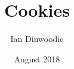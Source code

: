 \documentclass[a4paper,12pt]{book}
\begin{document}
\author{Ian Dinwoodie}
\title{Cookies}
\date{August 2018}

\frontmatter
\maketitle
\tableofcontents

\mainmatter



\backmatter
\end{document}
